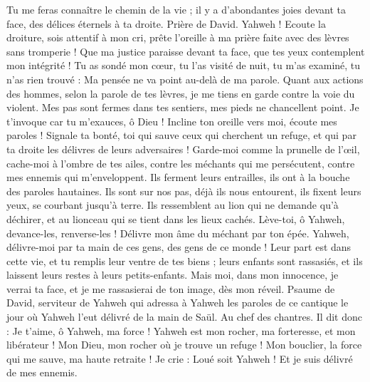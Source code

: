 \begin{multicols}{2}
Tu me feras connaître le chemin de la vie ; il y a d’abondantes joies devant ta face, des délices éternels à ta droite.
\VerseOne{}Prière de David. Yahweh ! Ecoute la droiture, sois attentif à mon cri, prête l'oreille à ma prière faite avec des lèvres sans tromperie !
Que ma justice paraisse devant ta face, que tes yeux contemplent mon intégrité !
Tu as sondé mon cœur, tu l'as visité de nuit, tu m'as examiné, tu n'as rien trouvé : Ma pensée ne va point au-delà de ma parole.
Quant aux actions des hommes, selon la parole de tes lèvres, je me tiens en garde contre la voie du violent.
Mes pas sont fermes dans tes sentiers, mes pieds ne chancellent point.
Je t'invoque car tu m'exauces, ô Dieu ! Incline ton oreille vers moi, écoute mes paroles !
Signale ta bonté, toi qui sauve ceux qui cherchent un refuge, et qui par ta droite les délivres de leurs adversaires !
Garde-moi comme la prunelle de l'œil, cache-moi à l'ombre de tes ailes,
contre les méchants qui me persécutent, contre mes ennemis qui m'enveloppent.
Ils ferment leurs entrailles, ils ont à la bouche des paroles hautaines.
Ils sont sur nos pas, déjà ils nous entourent, ils fixent leurs yeux, se courbant jusqu’à terre.
Ils ressemblent au lion qui ne demande qu'à déchirer, et au lionceau qui se tient dans les lieux cachés.
Lève-toi, ô Yahweh, devance-les, renverse-les ! Délivre mon âme du méchant par ton épée.
Yahweh, délivre-moi par ta main de ces gens, des gens de ce monde ! Leur part est dans cette vie, et tu remplis leur ventre de tes biens ; leurs enfants sont rassasiés, et ils laissent leurs restes à leurs petits-enfants.
Mais moi, dans mon innocence, je verrai ta face, et je me rassasierai de ton image, dès mon réveil.
\VerseOne{}Psaume de David, serviteur de Yahweh qui adressa à Yahweh les paroles de ce cantique le jour où Yahweh l'eut délivré de la main de Saül. Au chef des chantres.
Il dit donc : Je t’aime, ô Yahweh, ma force !
Yahweh est mon rocher, ma forteresse, et mon libérateur ! Mon Dieu, mon rocher où je trouve un refuge ! Mon bouclier, la force qui me sauve, ma haute retraite !
Je crie : Loué soit Yahweh ! Et je suis délivré de mes ennemis.

\end{multicols}
